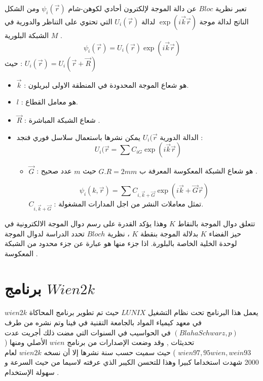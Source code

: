 تعبر نظرية $ Bloc $ عن دالة الموجة لإلكترون أحادي لكوهن-شام $ \psi_{i} (\vec{r}) $  ومن الشكل الناتج لدالة موجة $ \exp (i\vec{k}\vec{r}) $   لدالة $ U_{i} (\vec{r}) $  التي تحتوي على التناظر والدورية في الشبكة البلورية $ M $ .
\begin{equation}\label{key}
	\psi_{i} (\vec{r}) =  U_{i} (\vec{r}) \exp (i\vec{k}\vec{r})
\end{equation}
حيث : $  U_{i} (\vec{r}) = U_{i}(\vec{r} + \vec{R})  $
\begin{itemize}
	\item 
	$ \vec{k}  $ : هو شعاع الموجة المحدودة في المنطقة الاولى لبريلون.
	\item 
	$ l $ : هو معامل القطاع.
		\item 
		$ \vec{R} $ : شعاع الشبكة المباشرة .
			\item 
			الدالة الدورية $ U_{i}(\vec{r}  $ يمكن نشرها باستعمال سلاسل فوري فنجد :
			\begin{equation}\label{key}
			U_{i}(\vec{r} = \sum C_{iG} \exp (i\vec{k}\vec{r}) 	
			\end{equation}
		\begin{itemize}
			\item 
			$ \vec{G} $ : هو شعاع الشبكة المعكوسة المعرفة ب $ G.R = 2mm $ حيث $ m $ عدد صحيح . 
			
			\begin{equation}\label{key}
					\psi_{i} (k , \vec{r}) = \sum C_{i , \vec{k}+\vec{G}} \exp (i\vec{k}+\vec{G}\vec{r}) 
			\end{equation}
						$ C_{i , \vec{k}+\vec{G}} $ :  تمثل معاملات النشر من اجل المدارات المشغولة.	
		\end{itemize}

\end{itemize}

تتعلق دوال الموجة بالنقاط $ K $ وهذا يؤكد القدرة على رسم دوال الموجة الالكترونية في حيز الفضاء $ K $ بدلالة الموجة بنقطة $ K $ ، نظرية $ Bloch $ تحدد الدراسة لدوال الموجة لوحدة الخلية الخاصة بالبلورة.
اذا جزء منها هو عبارة عن جزء محدود من الشبكة المعكوسة . \cite{b6}

\section{ برنامج $ Wien2k $ }

يعمل هذا البرنامج تحت نظام التشغيل $ LUNIX  $ حيث تم  تطوير برنامج المحاكاة  $ wien2k   $ في معهد كيمياء المواد بالجامعة التقنية في فينا وتم  نشره من طرف $ ( Blaha Schwarz,p ) $ في الحواسيب في السنوات التي مضت ذلك أجريت عدت تحديثات , وقد وضعت الإصدارات من برنامج $ wien  $ الأصلي ومنها ( $ wien97 , 95 wien, wein93 $ ) حيث سميت حسب سنة نشرها إلا أن نسخه  $ wien2k $ لعام  2000 شهدت استخداما كبيرا وهذا للتحسن الكيبر الذي عرفته لاسيما من حيث السرعة و سهولة الإستخدام .\cite{b1}

